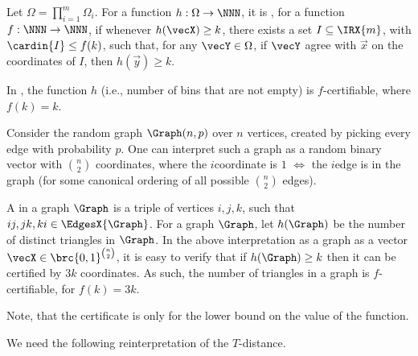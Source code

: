 \begin{defn}
    Let $\Omega =\prod_{i=1}^m \Omega_i$. For a function
    $h:\Omega \rightarrow \NNN$, it is , for a
    function $f:\NNN \rightarrow \NNN$, if whenever
    $h(\vecX ) \geq k$, there exists a set $I \subseteq \IRX{m}$, with
    $\cardin{I} \leq f(k)$, such that, for any $\vecY \in \Omega$, if
    $\vecY$ agree with $\vec{x}$ on the coordinates of $I$, then
    $h(\vec{y}) \geq k$.
\end{defn}

\begin{example}
    In , the function $h$ (i.e., number of bins
    that are not empty) is $f$-certifiable, where $f(k) = k$.
\end{example}

\begin{example}
    Consider the random graph $\Graph(n,p)$ over $n$ vertices, created
    by picking every edge with probability $p$. One can interpret such
    a graph as a random binary vector with $\binom{n}{2}$ coordinates,
    where the $i$\th coordinate is $1$ $\iff$ the $i$\th edge is in
    the graph (for some canonical ordering of all possible
    $\binom{n}{2}$ edges).

    A  in a graph $\Graph$ is a triple of vertices
    $i,j,k$, such that $ij, jk, ki \in \EdgesX{\Graph}$. For a graph
    $\Graph$, let $h(\Graph)$ be the number of distinct triangles in
    $\Graph$. In the above interpretation as a graph as a vector
    $\vecX \in \brc{0,1}^{\binom{n}{2}}$, it is easy to verify that if
    $h(\Graph) \geq k$ then it can be certified by $3k$
    coordinates. As such, the number of triangles in a graph is
    $f$-certifiable, for $f(k) = 3k$. %

    Note, that the certificate is only for the lower bound on the
    value of the function.
\end{example}

We need the following reinterpretation of the $T$-distance.

